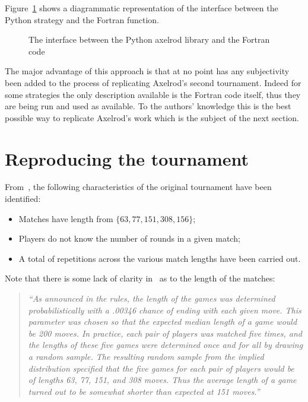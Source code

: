\documentclass{article}
\begin{document}
Figure~\ref{fig:strategy_diagram} shows a diagrammatic representation of the
interface between the Python strategy and the Fortran function.

\begin{figure}[!hbtp]
    \begin{center}
        \scalebox{.8}{
            
                     }
        \caption{The interface between the Python axelrod library and the
				 Fortran code}
        \label{fig:strategy_diagram}
    \end{center}
\end{figure}

The major advantage of this approach is that at no point has any subjectivity
been added to the process of replicating Axelrod's second tournament. Indeed for
some strategies the only description available is the Fortran code itself, thus
they are being run and used as available. To the authors' knowledge this is the
best possible way to replicate Axelrod's work which is the subject of the next
section.

\section{Reproducing the tournament}\label{sec:reproducing}

From~\cite{Axelrod1980b}, the following characteristics of the original
tournament have been identified:

\begin{itemize}
    \item Matches have length from \(\{63, 77, 151, 308, 156\}\);
    \item Players do not know the number of rounds in a given match;
    \item A total of repetitions
        across the various match lengths have been carried out.
\end{itemize}

Note that there is some lack of clarity in~\cite{Axelrod1980b} as to the length
of the matches:

\begin{quote}
    \textit{``As announced in the rules, the length of the games was determined
        probabilistically with a .00346 chance of ending with each given move.
        This parameter was chosen so that the expected median length of a game
        would be 200 moves. In practice, each pair of players was matched five
        times, and the lengths of these five games were determined once and for
        all by drawing a random sample. The resulting random sample from the
        implied distribution specified that the five games for each pair of
        players would be of lengths 63, 77, 151, and 308 moves. Thus the average
    length of a game turned out to be somewhat shorter than expected at 151
moves.''}
\end{quote}
\end{document}
